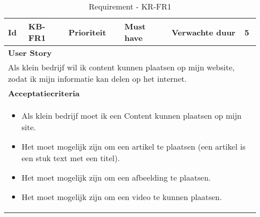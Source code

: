 \begin{table}[!ht]
	\caption{Requirement - KR-FR1}
	\label{rq:res5Sample}
	\begin{tabularx}{\textwidth}{|m{0.5cm}|l|m{2.0cm}|l|m{3.5cm}|l|}
		\hline
		\textbf{Id} & KB-FR1 & \textbf{Prioriteit} & Must have & \textbf{Verwachte duur} & 5                                                                                                         \\
		\hline
		\multicolumn{6}{|p{\dimexpr\linewidth-2\arrayrulewidth-2\tabcolsep}|}{\textbf{User Story}}                                                                                                   \\
		\hline
		
		\multicolumn{6}{|p{\dimexpr\linewidth-2\arrayrulewidth-2\tabcolsep}|}{Als klein bedrijf wil ik content kunnen plaatsen op mijn website, zodat ik mijn informatie kan delen op het internet.} \\
		\hline
		\hline
		\multicolumn{6}{|p{\dimexpr\linewidth-2\arrayrulewidth-2\tabcolsep}|}{\textbf{Acceptatiecriteria}}                                                                                           \\
		\hline
		\multicolumn{6}{|p{\dimexpr\linewidth-2\arrayrulewidth-2\tabcolsep}|}{
		\begin{itemize}
			\item{Als klein bedrijf moet ik een Content kunnen plaatsen op mijn site.}
			\item{Het moet mogelijk zijn om een artikel te plaatsen (een artikel is een stuk text met een titel).}
			\item{Het moet mogelijk zijn om een afbeelding te plaatsen.}
			\item{Het moet mogelijk zijn om een video te kunnen plaatsen.}
		\end{itemize}}                                                                                        \\
		\hline
	\end{tabularx}
\end{table}


